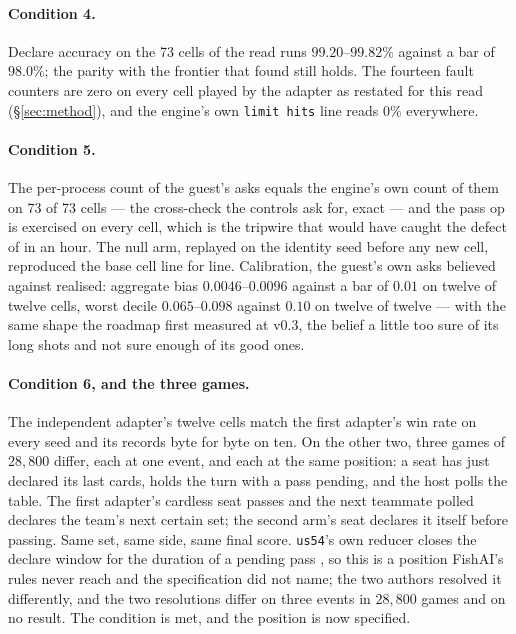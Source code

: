 \documentclass[11pt]{article}
\newcommand{\code}[1]{\texttt{#1}}
\newcommand{\usff}{\code{us54}}
\begin{document}
\paragraph{Condition 4.} Declare accuracy on the 73 cells of the read runs $99.20$--$99.82\%$
against a bar of $98.0\%$; the parity with the frontier that \cite{frontier} found still holds.
The fourteen fault counters are zero on every cell played by the adapter as restated for this read
(\S\ref{sec:method}), and the engine's own \code{limit hits} line reads $0\%$ everywhere.

\paragraph{Condition 5.} The per-process count of the guest's asks equals the engine's own count
of them on 73 of 73 cells --- the cross-check the controls ask for, exact --- and the pass op is
exercised on every cell, which is the tripwire that would have caught the defect of \cite{frontier}
in an hour. The null arm, replayed on the identity seed before any new cell, reproduced the base
cell line for line. Calibration, the guest's own asks believed against realised: aggregate bias
$0.0046$--$0.0096$ against a bar of $0.01$ on twelve of twelve cells, worst decile $0.065$--$0.098$
against $0.10$ on twelve of twelve --- with the same shape the roadmap first measured at v0.3, the
belief a little too sure of its long shots and not sure enough of its good ones.

\paragraph{Condition 6, and the three games.} The independent adapter's twelve cells match the
first adapter's win rate on every seed and its records byte for byte on ten. On the other two, three
games of $28{,}800$ differ, each at one event, and each at the same position: a seat has just
declared its last cards, holds the turn with a pass pending, and the host polls the table. The first
adapter's cardless seat passes and the next teammate polled declares the team's next certain set;
the second arm's seat declares it itself before passing. Same set, same side, same final score.
\usff{}'s own reducer closes the declare window for the duration of a pending pass \cite{rules}, so
this is a position FishAI's rules never reach and the specification did not name; the two authors
resolved it differently, and the two resolutions differ on three events in $28{,}800$ games and on
no result. The condition is met, and the position is now specified.
\end{document}
